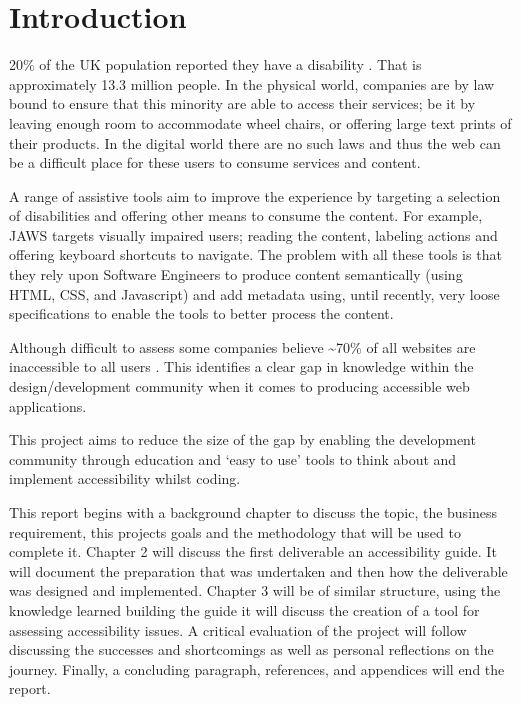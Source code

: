 \chapter{Introduction}
\label{introduction}
20\% of the UK population reported they have a disability
\citep{UkGovFamilySurvey}.
That is approximately 13.3 million people. In the physical world,
companies are by law
bound \citep{DDA} to ensure that this minority are able to access their services; be it by
leaving enough room to accommodate wheel chairs, or offering large text prints
of their products. In the digital world there are no such laws and thus the web can be a
difficult place for these users to consume services and content.

A range of assistive
tools aim to improve the experience by targeting a selection of
disabilities and offering other means to consume the content. For example,
JAWS \citep{JAWS} targets visually impaired users; reading the content,
labeling actions and offering keyboard shortcuts to navigate. The
problem
with all these tools is that they rely upon Software Engineers to produce
content semantically (using HTML, CSS, and Javascript) and add metadata using,
until recently,
very loose specifications \citep{WCAG} to enable the tools to better process
the content.

Although difficult to assess some companies believe \textasciitilde70\% of all
websites are inaccessible to all users \citep{Slate} \citep{SightAndSound}.
This identifies a clear gap in knowledge within the design/development community
when it comes to producing accessible web applications.

This project aims to reduce the size of the gap by enabling the development
community through education and `easy to use' tools to think about and
implement accessibility whilst coding.

This report begins with a background chapter to discuss the topic, the business
requirement, this projects goals and the methodology that will be used to
complete it. Chapter 2 will discuss the first deliverable an
accessibility guide. It will document the preparation that was undertaken and
then how the deliverable was designed and implemented. Chapter 3 will be
of similar structure, using the knowledge learned building the guide it will
discuss the creation of a tool for assessing accessibility issues. A
critical evaluation of the project will follow discussing the successes
and shortcomings as well as personal reflections on the journey. Finally, a
concluding paragraph, references, and appendices will end the report.

